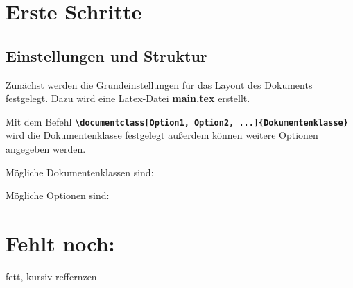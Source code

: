 \section{Erste Schritte}
\subsection{Einstellungen und Struktur}

Zunächst werden die Grundeinstellungen für das Layout des Dokuments festgelegt. Dazu wird eine Latex-Datei \textbf{main.tex} erstellt.

Mit dem Befehl \textbf{\texttt{\textbackslash documentclass[Option1, Option2, ...]\{Dokumentenklasse\}}} wird die Dokumentenklasse festgelegt außerdem können weitere Optionen angegeben werden. 

Mögliche Dokumentenklassen sind:


Mögliche Optionen sind:



\section{Fehlt noch:}

fett, kursiv
reffernzen
%
